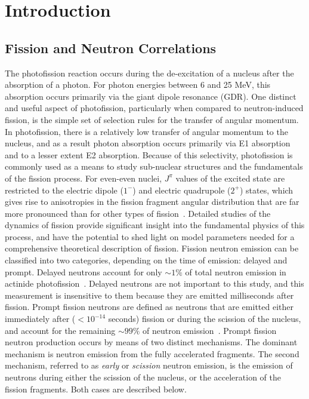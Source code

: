 \chapter{Introduction}
\label{sec:level1}

\section{Fission and Neutron Correlations}
The photofission reaction occurs during the de-excitation of a nucleus after the absorption of a photon.
For photon energies between 6 and 25 MeV, this absorption occurs primarily via the giant dipole resonance (GDR).
One distinct and useful aspect of photofission, particularly when compared to neutron-induced fission, is the simple set of selection rules for the transfer of angular momentum.
In photofission, there is a relatively low transfer of angular momentum to the nucleus, and as a result photon absorption occurs primarily via E1 absorption and to a lesser extent E2 absorption.
Because of this selectivity, photofission is commonly used as a means to study sub-nuclear structures and the fundamentals of the fission process.
For even-even nuclei, $J^{\pi}$ values of the excited state are restricted to the electric dipole ($1^{-}$) and electric quadrupole ($2^{+}$) states, which gives rise to anisotropies in the fission fragment angular distribution that are far more pronounced than for other types of fission~\cite{1977FragAss}.
Detailed studies of the dynamics of fission provide significant insight into the fundamental physics of this process, and have the potential to shed light on model parameters needed for a comprehensive theoretical description of fission.
Fission neutron emission can be classified into two categories, depending on the time of emission: delayed and prompt.
Delayed neutrons account for only $\sim1\%$ of total neutron emission in actinide photofission~\cite{Caldwell2017DelayedNs}.
Delayed neutrons are not important to this study, and this measurement is insensitive to them because they are emitted milliseconds after fission.
Prompt fission neutrons are defined as neutrons that are emitted either immediately after ($<10^{-14}$ seconds) fission or during the scission of the nucleus, and account for the remaining $\sim99\%$ of neutron emission~\cite{Caldwell2017DelayedNs}.
Prompt fission neutron production occurs by means of two distinct mechanisms.
The dominant mechanism is neutron emission from the fully accelerated fragments.
The second mechanism, referred to as \textit{early} or \textit{scission} neutron emission, is the emission of neutrons during either the scission of the nucleus, or the acceleration of the fission fragments.
Both cases are described below.

